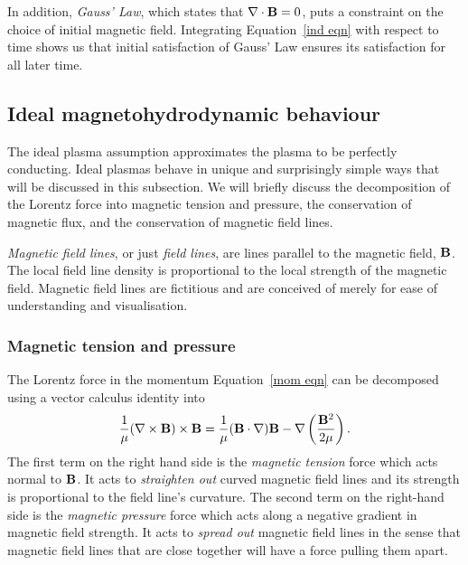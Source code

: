 In addition, \textit{Gauss' Law}, which states that $\nabla\cdot\mathbf{B} = 0$, puts a constraint on the choice of initial magnetic field. Integrating Equation~\eqref{ind eqn} with respect to time shows us that initial satisfaction of Gauss' Law ensures its satisfaction for all later time.


\subsection{Ideal magnetohydrodynamic behaviour}
The ideal plasma assumption approximates the plasma to be perfectly conducting. Ideal plasmas behave in unique and surprisingly simple ways that will be discussed in this subsection. We will briefly discuss the decomposition of the Lorentz force into magnetic tension and pressure, the conservation of magnetic flux, and the conservation of magnetic field lines.

\textit{Magnetic field lines}, or just \textit{field lines}, are lines parallel to the magnetic field, $\mathbf{B}$. The local field line density is proportional to the local strength of the magnetic field. Magnetic field lines are fictitious and are conceived of merely for ease of understanding and visualisation.


\subsubsection{Magnetic tension and pressure}
The Lorentz force in the momentum Equation~\eqref{mom eqn} can be decomposed using a vector calculus identity into
\begin{equation}
	\frac{1}{\mu}(\nabla\times\mathbf{B})\times\mathbf{B} = \frac{1}{\mu}(\mathbf{B}\cdot\nabla)\mathbf{B} - \nabla\left(\frac{\mathbf{B}^2}{2\mu}\right).
\end{equation}
The first term on the right hand side is the \textit{magnetic tension} force which acts normal to $\mathbf{B}$. It acts to \textit{straighten out} curved magnetic field lines and its strength is proportional to the field line's curvature. The second term on the right-hand side is the \textit{magnetic pressure} force which acts along a negative gradient in magnetic field strength. It acts to \textit{spread out} magnetic field lines in the sense that magnetic field lines that are close together will have a force pulling them apart.


